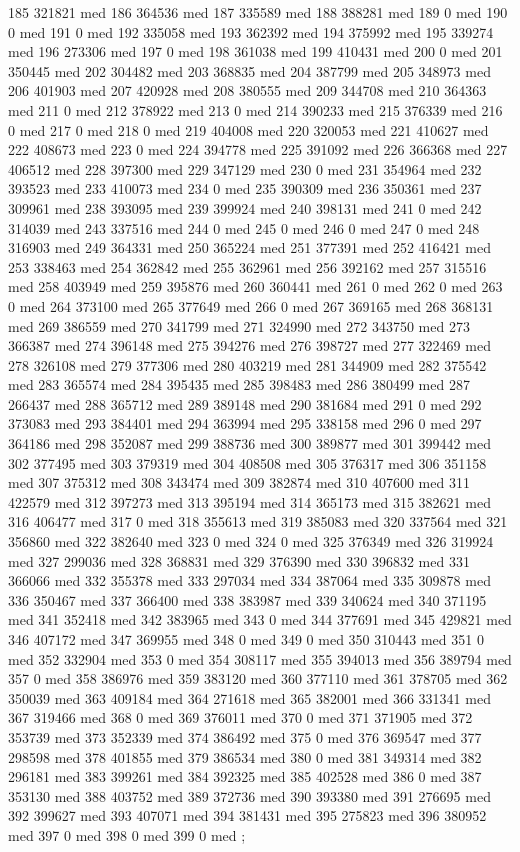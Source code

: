 {185 321821 med
186 364536 med
187 335589 med
188 388281 med
189 0 med
190 0 med
191 0 med
192 335058 med
193 362392 med
194 375992 med
195 339274 med
196 273306 med
197 0 med
198 361038 med
199 410431 med
200 0 med
201 350445 med
202 304482 med
203 368835 med
204 387799 med
205 348973 med
206 401903 med
207 420928 med
208 380555 med
209 344708 med
210 364363 med
211 0 med
212 378922 med
213 0 med
214 390233 med
215 376339 med
216 0 med
217 0 med
218 0 med
219 404008 med
220 320053 med
221 410627 med
222 408673 med
223 0 med
224 394778 med
225 391092 med
226 366368 med
227 406512 med
228 397300 med
229 347129 med
230 0 med
231 354964 med
232 393523 med
233 410073 med
234 0 med
235 390309 med
236 350361 med
237 309961 med
238 393095 med
239 399924 med
240 398131 med
241 0 med
242 314039 med
243 337516 med
244 0 med
245 0 med
246 0 med
247 0 med
248 316903 med
249 364331 med
250 365224 med
251 377391 med
252 416421 med
253 338463 med
254 362842 med
255 362961 med
256 392162 med
257 315516 med
258 403949 med
259 395876 med
260 360441 med
261 0 med
262 0 med
263 0 med
264 373100 med
265 377649 med
266 0 med
267 369165 med
268 368131 med
269 386559 med
270 341799 med
271 324990 med
272 343750 med
273 366387 med
274 396148 med
275 394276 med
276 398727 med
277 322469 med
278 326108 med
279 377306 med
280 403219 med
281 344909 med
282 375542 med
283 365574 med
284 395435 med
285 398483 med
286 380499 med
287 266437 med
288 365712 med
289 389148 med
290 381684 med
291 0 med
292 373083 med
293 384401 med
294 363994 med
295 338158 med
296 0 med
297 364186 med
298 352087 med
299 388736 med
300 389877 med
301 399442 med
302 377495 med
303 379319 med
304 408508 med
305 376317 med
306 351158 med
307 375312 med
308 343474 med
309 382874 med
310 407600 med
311 422579 med
312 397273 med
313 395194 med
314 365173 med
315 382621 med
316 406477 med
317 0 med
318 355613 med
319 385083 med
320 337564 med
321 356860 med
322 382640 med
323 0 med
324 0 med
325 376349 med
326 319924 med
327 299036 med
328 368831 med
329 376390 med
330 396832 med
331 366066 med
332 355378 med
333 297034 med
334 387064 med
335 309878 med
336 350467 med
337 366400 med
338 383987 med
339 340624 med
340 371195 med
341 352418 med
342 383965 med
343 0 med
344 377691 med
345 429821 med
346 407172 med
347 369955 med
348 0 med
349 0 med
350 310443 med
351 0 med
352 332904 med
353 0 med
354 308117 med
355 394013 med
356 389794 med
357 0 med
358 386976 med
359 383120 med
360 377110 med
361 378705 med
362 350039 med
363 409184 med
364 271618 med
365 382001 med
366 331341 med
367 319466 med
368 0 med
369 376011 med
370 0 med
371 371905 med
372 353739 med
373 352339 med
374 386492 med
375 0 med
376 369547 med
377 298598 med
378 401855 med
379 386534 med
380 0 med
381 349314 med
382 296181 med
383 399261 med
384 392325 med
385 402528 med
386 0 med
387 353130 med
388 403752 med
389 372736 med
390 393380 med
391 276695 med
392 399627 med
393 407071 med
394 381431 med
395 275823 med
396 380952 med
397 0 med
398 0 med
399 0 med
};
